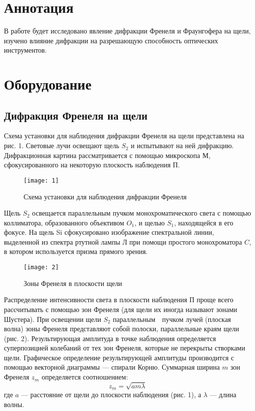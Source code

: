 \documentclass[a4paper, 12pt]{article}
\begin{document}

\section{Аннотация}
В работе будет исследовано явление дифракции Френеля и Фраунгофера на
щели, изучено
влияние дифракции на разрешающую способность оптических
инструментов.


\section{Оборудование}
\subsection*{Дифракция Френеля на щели}
Схема установки для наблюдения дифракции Френеля на щели представлена
на рис. 1. Световые лучи освещают щель $S_2$ и испытывают на ней
дифракцию. Дифракционная картина рассматривается с помощью микроскопа
М, сфокусированного на некоторую плоскость наблюдения П.

\begin{figure}[H]
    \texttt{[image: 1]} 
    \captionsetup{justification=centering}
    \caption{Схема установки для наблюдения дифракции Френеля}
\end{figure}


Щель $S_2$ освещается параллельным пучком монохроматического света с
помощью коллиматора, образованного объективом $O_1$, и щелью $S_1$,
находящейся в его фокусе. На щель Si сфокусировано изображение
спектральной линии, выделенной из спектра ртутной лампы Л при помощи
простого монохроматора $C$, в котором используется призма прямого
зрения.

\begin{wrapfigure}{r}{0.3\linewidth}
    \vspace{-16pt}
    \texttt{[image: 2]}
    \captionsetup{justification=centering}
    \caption{Зоны Френеля в плоскости щели}
\end{wrapfigure}

Распределение интенсивности света в плоскости наблюдения П проще всего
рассчитывать с помощью зон Френеля (для щели их иногда называют зонами
Шустера). При освещении щели $S_2$ параллельным пучком лучей (плоская
волна) зоны Френеля представляют собой полоски,
параллельные краям щели (рис. 2). Результирующая амплитуда в точке
наблюдения определяется суперпозицией колебаний от тех зон Френеля,
которые не перекрыты створками щели. Графическое определение
результирующей амплитуды производится с помощью векторной диаграммы —
спирали Корню. Суммарная ширина $m$ зон Френеля $z_m$ определяется
соотношением:
\begin{equation}
    z_m = \sqrt{a m \lambda}
\end{equation}
где $a$ --- расстояние от щели до плоскости наблюдения (рис. 1), а
$\lambda$ --- длина волны.
\end{document}
